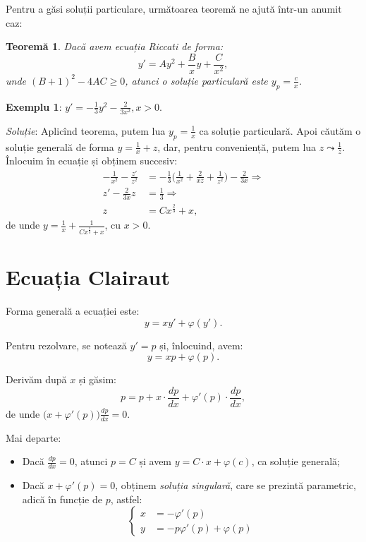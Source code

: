 \documentclass[11pt,a4paper]{article}
\theoremstyle{dotless}
\newtheorem{theorem}{Teorem\u{a}}[section]
\theoremstyle{dotlessdr}
\begin{document}
Pentru a găsi soluții particulare, următoarea teoremă ne ajută într-un anumit caz:

\begin{theorem}\label{thm:ric}
  Dacă avem ecuația Riccati de forma:
  \[
    y' = Ay^2 + \frac{B}{x}y + \frac{C}{x^2},
  \]
  unde $(B + 1)^2 - 4AC \geq 0$, atunci o soluție particulară este $y_p = \frac{c}{x}$.
\end{theorem}

\textbf{Exemplu 1}: $y' = -\frac{1}{3} y^2 - \frac{2}{3x^2}, x > 0$.

\emph{Soluție}: Aplicînd teorema, putem lua $y_p = \frac{1}{x}$ ca soluție particulară.
Apoi căutăm o soluție generală de forma $y = \frac{1}{x} + z$, dar, pentru conveniență,
putem lua $z \leadsto \frac{1}{z}$. Înlocuim în ecuație și obținem succesiv:
\begin{align*}
  -\frac{1}{x^2} - \frac{z'}{z^2} &= -\frac{1}{3} \Big( \frac{1}{x^2} + \frac{2}{xz} + \frac{1}{z^2} \Big) - \frac{2}{3x} \Rightarrow \\
  z' - \frac{2}{3x} z &= \frac{1}{3} \Rightarrow \\
  z &= Cx^{\frac{2}{3}} + x,
\end{align*}
de unde $y = \frac{1}{x} + \frac{1}{Cx^{\frac{2}{3}} + x}$, cu $x > 0$.


\section{Ecuația Clairaut}
\label{sec:clairaut}

Forma generală a ecuației este:
\[
  y = xy' + \varphi(y').
\]

Pentru rezolvare, se notează $y' = p$ și, înlocuind, avem:
\[
  y = xp + \varphi(p).
\]

Derivăm după $x$ și găsim:
\[
  p = p + x \cdot \frac{dp}{dx} + \varphi'(p) \cdot \frac{dp}{dx},
\]
de unde $\big( x + \varphi'(p) \big) \frac{dp}{dx} = 0$.

Mai departe:
\begin{itemize}
\item Dacă $\frac{dp}{dx} = 0$, atunci $p = C$ și avem $y = C \cdot x + \varphi(c)$, ca soluție generală;
\item Dacă $x + \varphi'(p) = 0$, obținem \emph{soluția singulară}, care se prezintă parametric, adică
  în funcție de $p$, astfel:
  \[
    \begin{cases}
      x &= -\varphi'(p) \\
      y &= -p\varphi'(p) + \varphi(p)
    \end{cases}
  \]
\end{itemize}
\end{document}
